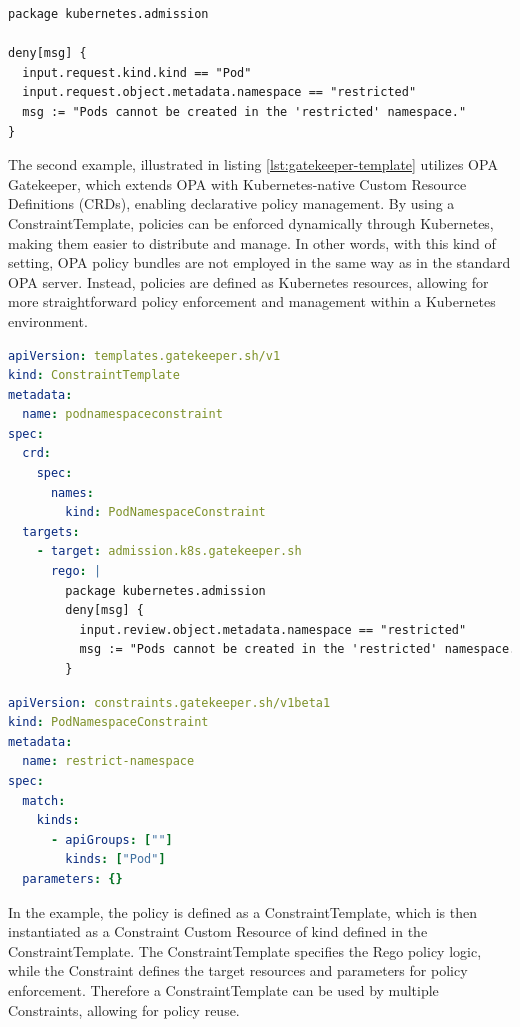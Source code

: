 \lstset{style=python}
\begin{lstlisting}[language=rego, caption={Simple OPA Rego Policy}, label={lst:opa-rego}]
package kubernetes.admission

deny[msg] {
  input.request.kind.kind == "Pod"
  input.request.object.metadata.namespace == "restricted"
  msg := "Pods cannot be created in the 'restricted' namespace."
}
\end{lstlisting}

The second example, illustrated in listing \ref{lst:gatekeeper-template} utilizes OPA Gatekeeper, which extends OPA with Kubernetes-native Custom Resource Definitions (CRDs), enabling declarative policy management. By using a ConstraintTemplate, policies can be enforced dynamically through Kubernetes, making them easier to distribute and manage.
In other words, with this kind of setting, OPA policy bundles are not employed in the same way as in the standard OPA server. Instead, policies are defined as Kubernetes resources, allowing for more straightforward policy enforcement and management within a Kubernetes environment.

\begin{lstlisting}[language=yaml, caption={OPA Gatekeeper ConstraintTemplate}, label={lst:gatekeeper-template}]
apiVersion: templates.gatekeeper.sh/v1
kind: ConstraintTemplate
metadata:
  name: podnamespaceconstraint
spec:
  crd:
    spec:
      names:
        kind: PodNamespaceConstraint
  targets:
    - target: admission.k8s.gatekeeper.sh
      rego: |
        package kubernetes.admission
        deny[msg] {
          input.review.object.metadata.namespace == "restricted"
          msg := "Pods cannot be created in the 'restricted' namespace."
        }
\end{lstlisting}

\begin{lstlisting}[language=yaml, caption={OPA Gatekeeper Constraint}, label={lst:gatekeeper-constraint}]
apiVersion: constraints.gatekeeper.sh/v1beta1
kind: PodNamespaceConstraint
metadata:
  name: restrict-namespace
spec:
  match:
    kinds:
      - apiGroups: [""]
        kinds: ["Pod"]
  parameters: {}
\end{lstlisting}

In the example, the policy is defined as a ConstraintTemplate, which is then instantiated as a Constraint Custom Resource of kind defined in the ConstraintTemplate. The ConstraintTemplate specifies the Rego policy logic, while the Constraint defines the target resources and parameters for policy enforcement. Therefore a ConstraintTemplate can be used by multiple Constraints, allowing for policy reuse.

